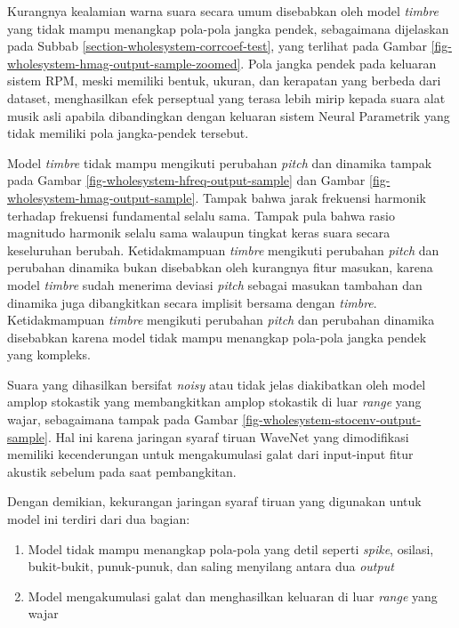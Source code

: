 Kurangnya kealamian warna suara secara umum disebabkan oleh model \textit{timbre} yang tidak mampu menangkap pola-pola jangka pendek, sebagaimana dijelaskan pada Subbab \ref{section-wholesystem-corrcoef-test}, yang terlihat pada Gambar \ref{fig-wholesystem-hmag-output-sample-zoomed}. Pola jangka pendek pada keluaran sistem RPM, meski memiliki bentuk, ukuran, dan kerapatan yang berbeda dari dataset, menghasilkan efek perseptual yang terasa lebih mirip kepada suara alat musik asli apabila dibandingkan dengan keluaran sistem Neural Parametrik yang tidak memiliki pola jangka-pendek tersebut.

Model \textit{timbre} tidak mampu mengikuti perubahan \textit{pitch} dan dinamika tampak pada Gambar \ref{fig-wholesystem-hfreq-output-sample} dan Gambar \ref{fig-wholesystem-hmag-output-sample}. Tampak bahwa jarak frekuensi harmonik terhadap frekuensi fundamental selalu sama. Tampak pula bahwa rasio magnitudo harmonik selalu sama walaupun tingkat keras suara secara keseluruhan berubah. Ketidakmampuan \textit{timbre} mengikuti perubahan \textit{pitch} dan perubahan dinamika bukan disebabkan oleh kurangnya fitur masukan, karena model \textit{timbre} sudah menerima deviasi \textit{pitch} sebagai masukan tambahan dan dinamika juga dibangkitkan secara implisit bersama dengan \textit{timbre}. Ketidakmampuan \textit{timbre} mengikuti perubahan \textit{pitch} dan perubahan dinamika disebabkan karena model tidak mampu menangkap pola-pola jangka pendek yang kompleks.

Suara yang dihasilkan bersifat \textit{noisy} atau tidak jelas diakibatkan oleh model amplop stokastik yang membangkitkan amplop stokastik di luar \textit{range} yang wajar, sebagaimana tampak pada Gambar \ref{fig-wholesystem-stocenv-output-sample}. Hal ini karena jaringan syaraf tiruan WaveNet yang dimodifikasi memiliki kecenderungan untuk mengakumulasi galat dari input-input fitur akustik sebelum pada saat pembangkitan.

Dengan demikian, kekurangan jaringan syaraf tiruan yang digunakan untuk model ini terdiri dari dua bagian:
\begin{enumerate}
	\item Model tidak mampu menangkap pola-pola yang detil seperti \textit{spike}, osilasi, bukit-bukit, punuk-punuk, dan saling menyilang antara dua \textit{output}
	\item Model mengakumulasi galat dan menghasilkan keluaran di luar \textit{range} yang wajar
\end{enumerate}

